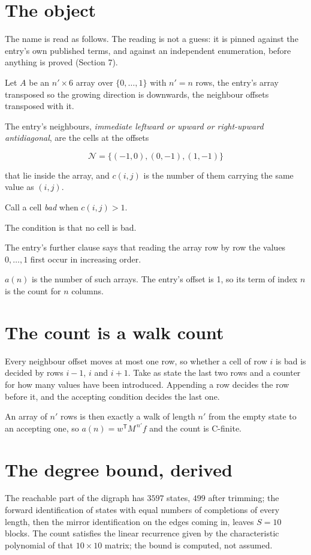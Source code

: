 \documentclass[11pt]{article}
\theoremstyle{definition}
\begin{document}
\section{The object}

The name is read as follows. The reading is not a guess: it is pinned against the entry's own published terms, and against an independent enumeration, before anything is proved (Section 7).

Let $A$ be an $n' \times 6$ array over $\{0,\dots,1\}$ with $n' = n$ rows, the entry's array transposed so the growing direction is downwards, the neighbour offsets transposed with it.

The entry's neighbours, {\itshape immediate leftward or upward or right-upward antidiagonal}, are the cells at the offsets

\[\mathcal{N} = \{(-1,0), (0,-1), (1,-1)\}\]

that lie inside the array, and $c(i,j)$ is the number of them carrying the same value as $(i,j)$.

Call a cell {\itshape bad} when $c(i,j) > 1$.

The condition is that no cell is bad.

The entry's further clause says that reading the array row by row the values $0,\dots,1$ first occur in increasing order.

$a(n)$ is the number of such arrays. The entry's offset is 1, so its term of index $n$ is the count for $n$ columns.

\section{The count is a walk count}

Every neighbour offset moves at most one row, so whether a cell of row $i$ is bad is decided by rows $i-1$, $i$ and $i+1$. Take as state the last two rows and a counter for how many values have been introduced. Appending a row decides the row before it, and the accepting condition decides the last one.

An array of $n'$ rows is then exactly a walk of length $n'$ from the empty state to an accepting one, so $a(n) = w^{\mathsf T}M^{\,n'}f$ and the count is C-finite.

\section{The degree bound, derived}

The reachable part of the digraph has $3597$ states, $499$ after trimming; the forward identification of states with equal numbers of completions of every length, then the mirror identification on the edges coming in, leaves $S = 10$ blocks. The count satisfies the linear recurrence given by the characteristic polynomial of that $10\times10$ matrix; the bound is computed, not assumed.
\end{document}
